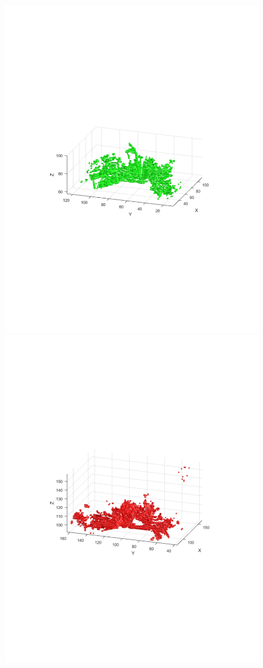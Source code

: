 \documentclass{UCF_ETD}
\begin{document}
\begin{figure}[H] 
\begin{center}
\includegraphics[scale=0.4]{RobustRegistration/Scan1}
\includegraphics[scale=0.4]{RobustRegistration/Scan2}

\end{center}
\end{figure}
\end{document}
